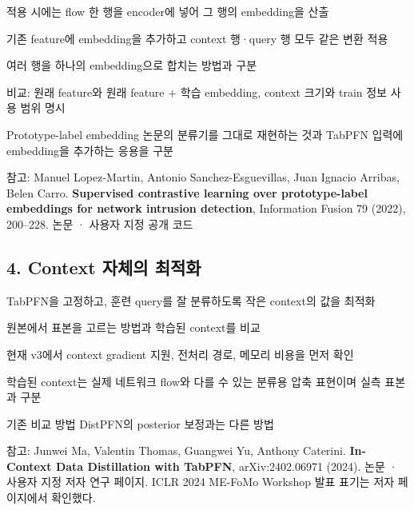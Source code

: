 \par\noindent \textbullet\enspace 적용 시에는 flow 한 행을 encoder에 넣어 그 행의 embedding을 산출


\par\noindent \textbullet\enspace 기존 feature에 embedding을 추가하고 context 행·query 행 모두 같은 변환 적용


\par\noindent \textbullet\enspace 여러 행을 하나의 embedding으로 합치는 방법과 구분


\par\noindent \textbullet\enspace 비교: 원래 feature와 원래 feature +\allowbreak{} 학습 embedding, context 크기와 train 정보 사용 범위 명시


\par\noindent \textbullet\enspace Prototype-label embedding 논문의 분류기를 그대로 재현하는 것과 TabPFN 입력에 embedding을 추가하는 응용을 구분


참고: Manuel Lopez-Martin, Antonio Sanchez-Esguevillas, Juan Ignacio Arribas, Belen Carro. \textbf{Supervised contrastive learning over prototype-label embeddings for network intrusion detection}, Information Fusion 79 (2022), 200–228. 논문 · 사용자 지정 공개 코드

\subsection{4. Context 자체의 최적화}
\par\noindent \textbullet\enspace TabPFN을 고정하고, 훈련 query를 잘 분류하도록 작은 context의 값을 최적화


\par\noindent \textbullet\enspace 원본에서 표본을 고르는 방법과 학습된 context를 비교


\par\noindent \textbullet\enspace 현재 v3에서 context gradient 지원, 전처리 경로, 메모리 비용을 먼저 확인


\par\noindent \textbullet\enspace 학습된 context는 실제 네트워크 flow와 다를 수 있는 분류용 압축 표현이며 실측 표본과 구분


\par\noindent \textbullet\enspace 기존 비교 방법 DistPFN의 posterior 보정과는 다른 방법


참고: Junwei Ma, Valentin Thomas, Guangwei Yu, Anthony Caterini. \textbf{In-Context Data Distillation with TabPFN}, arXiv:2402.06971 (2024). 논문 · 사용자 지정 저자 연구 페이지. ICLR 2024 ME-FoMo Workshop 발표 표기는 저자 페이지에서 확인했다.

